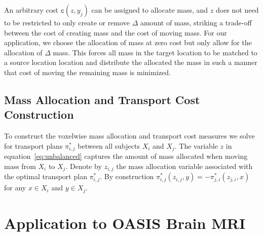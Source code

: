 \documentclass{llncs}
\newcommand{\cost}[0]{\mathtt{c}}
\newcommand{\coupling}[0]{\pi}
\begin{document}
An arbitrary cost $\cost(z, y_j)$ can be assigned to allocate mass, and $z$
does not need to be restricted to only create or remove $\Delta$ amount of
mass, striking a trade-off between the cost of creating mass and the cost of
moving mass. For our application, we choose the allocation of mass at zero cost
but only allow for the allocation of $\Delta$ mass. This forces all mass in the
target location to be matched to a source location location and distribute the
allocated the mass in such a manner that cost of moving the remaining mass is
minimized.

\subsection{Mass Allocation and Transport Cost Construction}
\label{sec:mass}
To construct the voxelwise mass allocation and transport cost measures we solve
for transport plans $\coupling^*_{i,j}$ between all subjects $X_i$ and $X_j$.  
The variable $z$ in equation~\ref{eq:unbalanced} captures the amount of mass
allocated when moving mass from $X_i$ to $X_j$. Denote by $z_{i, j}$ the mass
allocation variable associated with the optimal transport plan
$\coupling^*_{i,j}$.  By construction $\coupling^*_{i,j}(z_{i,j}, y) =
-\coupling^*_{j,i}(z_{j,i}, x)$ for any $x \in X_i$ and $y \in X_j$.  





\section{Application to OASIS Brain MRI}
\end{document}
